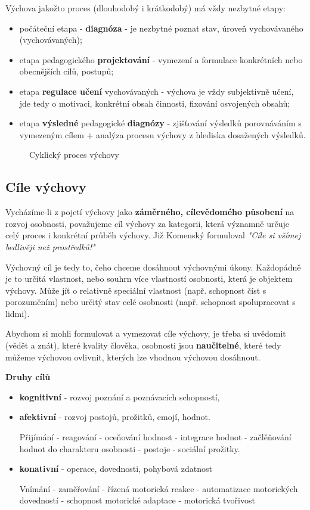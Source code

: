 \documentclass[a4paper,12pt,final]{report}
\begin{document}
Výchova jakožto proces (dlouhodobý i krátkodobý) má vždy nezbytné etapy:
\begin{itemize}
 \item počáteční etapa - \textbf{diagnóza} - je nezbytné poznat stav, úroveň vychovávaného (vychovávaných);
 \item etapa pedagogického \textbf{projektování} - vymezení a formulace konkrétních nebo obecnějších cílů, postupů;
 \item etapa \textbf{regulace učení} vychovávaných - výchova je vždy subjektivně učení, jde tedy o motivaci, konkrétní obsah činnosti, fixování osvojených obsahů;
 \item etapa \textbf{výsledné} pedagogické \textbf{diagnózy} - zjišťování výsledků porovnáváním s vymezeným cílem + analýza procesu výchovy z hlediska dosažených výsledků.
\end{itemize}

\begin{figure}[ht!]
\centering
{}
\caption{Cyklický proces výchovy}
\end{figure}\pagelogos

\subsection*{Cíle výchovy}
\pagelogos
Vycházíme-li z pojetí výchovy jako \textbf{záměrného, cílevědomého působení} na rozvoj osobnosti, považujeme cíl výchovy za kategorii, která významně určuje celý proces i konkrétní průběh výchovy. Již Komenský formuloval \textit{"Cíle si všímej bedlivěji než prostředků!"}

Výchovný cíl je tedy to, čeho chceme dosáhnout výchovnými úkony. Každopádně je to určitá vlastnost, nebo souhrn více vlastností osobnosti, která je objektem výchovy. Může jít o relativně speciální vlastnost (např. schopnost číst s porozuměním) nebo určitý stav celé osobnosti (např. schopnost spolupracovat s lidmi).

Abychom si mohli formulovat a vymezovat cíle výchovy, je třeba si uvědomit (vědět a znát), které kvality člověka, osobnosti jsou \textbf{naučitelné}, které tedy můžeme výchovou ovlivnit, kterých lze vhodnou výchovou dosáhnout.

\textbf{Druhy cílů}
\begin{itemize}
 \item \textbf{kognitivní} - rozvoj poznání a poznávacích schopností,
 \item \textbf{afektivní} - rozvoj postojů, prožitků, emojí, hodnot.
 
 Přijímání - reagování - oceňování hodnost - integrace hodnot - začlěňování hodnot do charakteru osobnosti - postoje - sociální prožitky.
 \item \textbf{konativní} - operace, dovednosti, pohybová zdatnost
 
 Vnímání - zaměřování - řízená motorická reakce - automatizace motorických dovedností - schopnost motorické adaptace - motorická tvořivost
\end{itemize}
\end{document}

